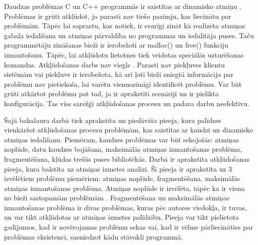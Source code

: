 ﻿Daudzas problēmas C un C++ programmās ir saistītas ar dinamisko atmiņu \cite{TFM}.
Problēmas ir grūti atkļūdot, jo parasti nav tiešo pazīmju, kas liecinātu par problēmām.
Tāpēc lai saprastu, kas notiek, ir svarīgi zināt kā realizēta atmiņas gabala iedalīšana un atmiņas pārvaldība no programmas un iedalītāja puses.
Taču programmētāju zināšanas bieži ir ierobežoti ar malloc() un free() funkciju izmantošanu. 
Tāpēc, lai atkļūdotu lietotnes tiek veidotas speciālās uzturēšanas komandas.
Atkļūdošanas darbs nav viegls \cite{ER}. Parasti nav piekļuves klientu sistēmām vai piekļuve ir ierobežota, kā arī ļoti bieži sniegtā informācija par problēmu nav pietiekoša, lai varētu viennozīmīgi identificēt problēmu.
Var būt grūti atkārtot problēmu pat tad, ja ir aprakstīti scenāriji un ir pielikta konfigurācija.
Tas viss sarežģī atkļūdošanas procesu un padara darbu neefektīvu.

Šajā bakalaura darbā tiek aprakstīta un piedāvāta pieeja, kura palīdzes vienkāršot atkļūdošanas procesu problēmām, kas saistītas ar kaudzi un dinamisko atmiņas iedalīšanu.
Piemēram, kaudzes problēmas var būt sekojošās: atmiņas noplūde, datu kaudzes bojāšana, maksimālās atmiņas izmantošanas problēma, fragmentēšana, kļūdas trešās puses bibliotēkās.
Darbā ir aprakstīta atkļūdošanas pieeja, kura balstīta uz atmiņas izmetes analīzi.
Šī pieeja ir aprakstīta uz 3 izvēlētiem problēmu piemēriem: atmiņas noplūde, fragmentēšana, maksimālās atmiņas izmantošanas problēma.
Atmiņas noplūde ir izvēlēta, tāpēc ka ir viena no bieži sastopamām problēmām \cite{GNED}.
Fragmentēšana un maksimālās atmiņas izmantošanas problēma ir divas problēmas, kuras pēc autores viedokļa, ir tuvas, un var tikt atkļūdotas ar atmiņas izmetes palīdzību.
Pieeja var tikt pielietota gadījumos, kad ir novērojamas problēmu sekas vai, kad ir vēlme pārliecināties par problēmas eksistenci, sasniedzot kādu stāvokli programmā.



